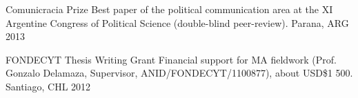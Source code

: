 


\begin{cvhonors}
\cvhonor
{Comunicracia Prize}
{Best paper of the political communication area at the XI Argentine Congress of Political Science (double-blind peer-review).} %
{Parana, ARG}
{2013}
\end{cvhonors}

\vspace{1mm}



\begin{cvhonors}
\cvhonor
{FONDECYT Thesis Writing Grant}
{Financial support for MA fieldwork (Prof. Gonzalo Delamaza, Supervisor, ANID/FONDECYT/1100877), about USD\$1 500.} %
{Santiago, CHL}
{2012}
\end{cvhonors}

\vspace{1mm}

